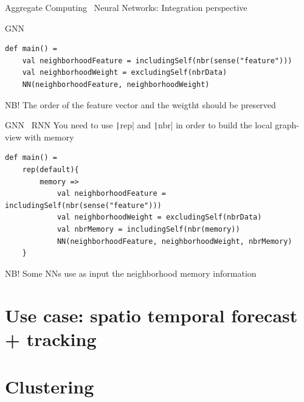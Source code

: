 \documentclass[presentation, 9pt]{beamer}\mode<presentation>{\usetheme{AMSBolognaFC}}
\begin{document}
\begin{frame}{Aggregate Computing \faPlus \, Neural Networks: Integration perspective}
\begin{alertblock}{GNN}
\begin{verbatim}
def main() = 
	val neighborhoodFeature = includingSelf(nbr(sense("feature")))
	val neighborhoodWeight = excludingSelf(nbrData)
	NN(neighborhoodFeature, neighborhoodWeight)
\end{verbatim}
NB! The order of the feature vector and the weigtht should be preserved
\end{alertblock}
\begin{alertblock}{GNN \faPlus \, RNN}
	You need to use \texttt|rep| and \texttt|nbr| in order to build the local graph-view with memory
\begin{verbatim}
def main() =
	rep(default){
		memory => 
			val neighborhoodFeature = includingSelf(nbr(sense("feature")))
			val neighborhoodWeight = excludingSelf(nbrData)
			val nbrMemory = includingSelf(nbr(memory))
			NN(neighborhoodFeature, neighborhoodWeight, nbrMemory)
	}
\end{verbatim}
NB! Some NNs use as input the neighborhood memory information
\end{alertblock}
\end{frame}

\section{Use case: spatio temporal forecast + tracking}


\section{Clustering}


\section*{}

\frame{\titlepage}

\section*{\refname}
\end{document}
